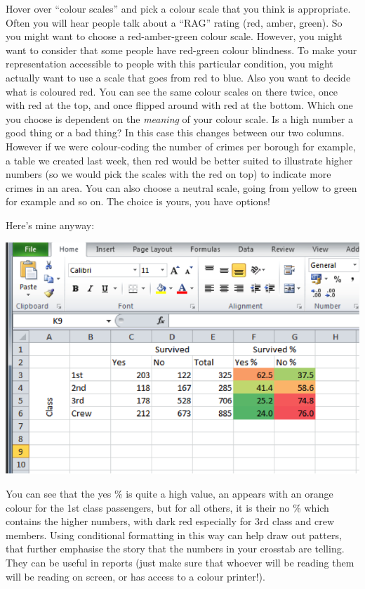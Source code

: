 \documentclass[]{book}
\theoremstyle{definition}
\theoremstyle{definition}
\theoremstyle{definition}
\theoremstyle{remark}
\begin{document}
Hover over ``colour scales'' and pick a colour scale that you think is
appropriate. Often you will hear people talk about a ``RAG'' rating
(red, amber, green). So you might want to choose a red-amber-green
colour scale. However, you might want to consider that some people have
red-green colour blindness. To make your representation accessible to
people with this particular condition, you might actually want to use a
scale that goes from red to blue. Also you want to decide what is
coloured red. You can see the same colour scales on there twice, once
with red at the top, and once flipped around with red at the bottom.
Which one you choose is dependent on the \emph{meaning} of your colour
scale. Is a high number a good thing or a bad thing? In this case this
changes between our two columns. However if we were colour-coding the
number of crimes per borough for example, a table we created last week,
then red would be better suited to illustrate higher numbers (so we
would pick the scales with the red on top) to indicate more crimes in an
area. You can also choose a neutral scale, going from yellow to green
for example and so on. The choice is yours, you have options!

Here's mine anyway:

\includegraphics{imgs/cond_form_3.png}

You can see that the yes \% is quite a high value, an appears with an
orange colour for the 1st class passengers, but for all others, it is
their no \% which contains the higher numbers, with dark red especially
for 3rd class and crew members. Using conditional formatting in this way
can help draw out patters, that further emphasise the story that the
numbers in your crosstab are telling. They can be useful in reports
(just make sure that whoever will be reading them will be reading on
screen, or has access to a colour printer!).
\end{document}
